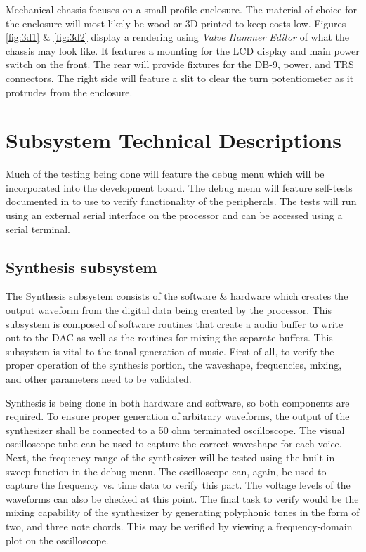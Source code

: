 \documentclass[bibtotocnumbered,abstract=on,paper=a4,fontsize=12pt,parskip=on,halfparskip=on]{scrartcl}		%
\begin{document}
\begin{enumerate}
      Mechanical chassis focuses on a small profile enclosure. The material of choice for the enclosure will most likely be wood or 3D printed to keep costs low. Figures \ref{fig:3d1} \&  \ref{fig:3d2} display a rendering using \textit{Valve Hammer Editor} of what the chassis may look like. It features a mounting for the LCD display and main power switch on the front. The rear will provide fixtures for the DB-9, power, and TRS connectors. The right side will feature a slit to clear the turn potentiometer as it protrudes from the enclosure.
    \end{enumerate}

      \clearpage
\section{Subsystem Technical Descriptions}
  Much of the testing being done will feature the debug menu which will be incorporated into the development board. The debug menu will feature self-tests documented in  to use to verify functionality of the peripherals. The tests will run using an external serial interface on the processor and can be accessed using a serial terminal.\par
  \subsection{Synthesis subsystem}
    The Synthesis subsystem consists of the software \& hardware which creates the output waveform from the digital data being created by the processor. This subsystem is composed of software routines that create a audio buffer to write out to the DAC as well as the routines for mixing the separate buffers. This subsystem is vital to the tonal generation of music. First of all, to verify the proper operation of the synthesis portion, the waveshape, frequencies, mixing, and other parameters need to be validated. 

    Synthesis is being done in both hardware and software, so both components are required. To ensure proper generation of arbitrary waveforms, the output of the synthesizer shall be connected to a 50 ohm terminated oscilloscope. The visual oscilloscope tube can be used to capture the correct waveshape for each voice. Next, the frequency range of the synthesizer will be tested using the built-in sweep function in the debug menu. The oscilloscope can, again, be used to capture the frequency vs. time data to verify this part. The voltage levels of the waveforms can also be checked at this point. The final task to verify would be the mixing capability of the synthesizer by generating polyphonic tones in the form of two, and three note chords. This may be verified by viewing a frequency-domain plot on the oscilloscope.
\end{document}
